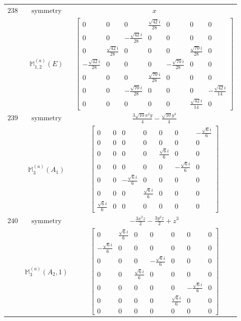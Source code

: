 \documentclass[fleqn,8pt,landscape]{jsarticle}
\begin{document}
\begin{longtable}{ccc}
$ 238 $ & $ \text{symmetry} $ & $ x $ \\
$  $ & $ \mathbb{M}_{1,2}^{(a)}(E) $ & $ \begin{bmatrix} 0 & 0 & 0 & \frac{\sqrt{42} i}{28} & 0 & 0 & 0 \\ 0 & 0 & - \frac{\sqrt{42} i}{28} & 0 & 0 & 0 & 0 \\ 0 & \frac{\sqrt{42} i}{28} & 0 & 0 & 0 & \frac{\sqrt{70} i}{28} & 0 \\ - \frac{\sqrt{42} i}{28} & 0 & 0 & 0 & - \frac{\sqrt{70} i}{28} & 0 & 0 \\ 0 & 0 & 0 & \frac{\sqrt{70} i}{28} & 0 & 0 & 0 \\ 0 & 0 & - \frac{\sqrt{70} i}{28} & 0 & 0 & 0 & - \frac{\sqrt{42} i}{14} \\ 0 & 0 & 0 & 0 & 0 & \frac{\sqrt{42} i}{14} & 0 \end{bmatrix} $ \\ \hline
$ 239 $ & $ \text{symmetry} $ & $ \frac{3 \sqrt{10} x^{2} y}{4} - \frac{\sqrt{10} y^{3}}{4} $ \\
$  $ & $ \mathbb{M}_{3}^{(a)}(A_{1}) $ & $ \begin{bmatrix} 0 & 0 & 0 & 0 & 0 & 0 & - \frac{\sqrt{6} i}{6} \\ 0 & 0 & 0 & 0 & 0 & 0 & 0 \\ 0 & 0 & 0 & 0 & \frac{\sqrt{6} i}{6} & 0 & 0 \\ 0 & 0 & 0 & 0 & 0 & - \frac{\sqrt{6} i}{6} & 0 \\ 0 & 0 & - \frac{\sqrt{6} i}{6} & 0 & 0 & 0 & 0 \\ 0 & 0 & 0 & \frac{\sqrt{6} i}{6} & 0 & 0 & 0 \\ \frac{\sqrt{6} i}{6} & 0 & 0 & 0 & 0 & 0 & 0 \end{bmatrix} $ \\ \hline
$ 240 $ & $ \text{symmetry} $ & $ - \frac{3 x^{2} z}{2} - \frac{3 y^{2} z}{2} + z^{3} $ \\
$  $ & $ \mathbb{M}_{3}^{(a)}(A_{2},1) $ & $ \begin{bmatrix} 0 & \frac{\sqrt{6} i}{6} & 0 & 0 & 0 & 0 & 0 \\ - \frac{\sqrt{6} i}{6} & 0 & 0 & 0 & 0 & 0 & 0 \\ 0 & 0 & 0 & - \frac{\sqrt{6} i}{6} & 0 & 0 & 0 \\ 0 & 0 & \frac{\sqrt{6} i}{6} & 0 & 0 & 0 & 0 \\ 0 & 0 & 0 & 0 & 0 & - \frac{\sqrt{6} i}{6} & 0 \\ 0 & 0 & 0 & 0 & \frac{\sqrt{6} i}{6} & 0 & 0 \\ 0 & 0 & 0 & 0 & 0 & 0 & 0 \end{bmatrix} $ \\ \hline

\end{longtable}
\end{document}
